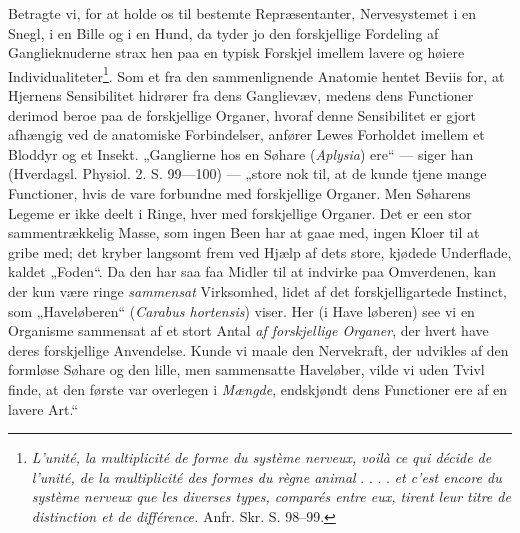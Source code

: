 \documentclass[11pt]{book}
\newcommand{\opage}[1]{\marginnote{\footnotesize\textit{[#1]}}}
\begin{document}
\opage{378} \setcounter{footnote}{0}%
Betragte vi, for at holde os til bestemte Repræsentanter,
Nervesystemet i en Snegl, i en Bille og i en Hund, da tyder jo den
forskjellige Fordeling af Ganglieknuderne strax hen paa en typisk
Forskjel imellem lavere og høiere
Individualiteter\footnote{\textit{L'unité, la multiplicité de forme du
système nerveux, voilà ce qui décide de l'unité, de la multiplicité
des formes du règne animal} . . . . \textit{et c'est encore du
système nerveux que les diverses types, comparés entre eux, tirent
leur titre de distinction et de différence.} Anfr. Skr.
S. 98--99.}. Som et fra den sammenlignende Anatomie hentet Beviis
for, at Hjernens Sensibilitet hidrører fra dens Ganglievæv, medens
dens Functioner derimod beroe paa de forskjellige Organer, hvoraf
denne Sensibilitet er gjort afhængig ved de anatomiske Forbindelser,
anfører Lewes Forholdet imellem et Bloddyr og et Insekt. „Ganglierne
hos en Søhare (\textit{Aplysia}) ere“ --- siger han (Hverdagsl.
Physiol. 2. S. 99---100) --- „store nok til, at de kunde tjene mange
Functioner, hvis de vare forbundne med forskjellige Organer. Men
Søharens Legeme er ikke deelt i Ringe, hver med forskjellige
Organer. Det er een stor sammentrækkelig Masse, som ingen Been har at
gaae med, ingen Kloer til at gribe med; det kryber langsomt frem ved
Hjælp af dets store, kjødede Underflade, kaldet „Foden“. Da den har
saa faa Midler til at indvirke paa Omverdenen, kan der kun være ringe
\emph{sammensat} Virksomhed, lidet af det forskjelligartede Instinct,
som „Haveløberen“ (\textit{Carabus hortensis}) viser. Her (i
Have\-%
\opage{379} \setcounter{footnote}{0}%
løberen) see vi en Organisme sammensat af et stort Antal
\emph{af forskjellige Organer}, der hvert have deres forskjellige
Anvendelse. Kunde vi maale den Nervekraft, der udvikles af den
formløse Søhare og den lille, men sammensatte Haveløber, vilde vi
uden Tvivl finde, at den første var overlegen i \emph{Mængde},
endskjøndt dens Functioner ere af en lavere Art.“
\end{document}
